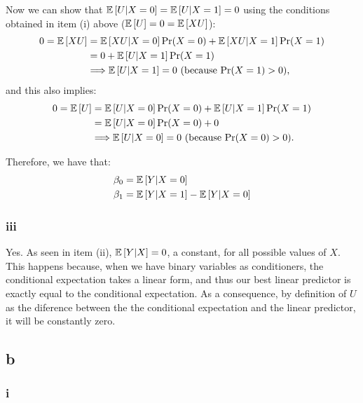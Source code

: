 \documentclass[12pt]{paper}
\begin{document}
Now we can show that $\mathbb{E} \left [ U|X=0 \right ]=\mathbb{E} \left [ U|X=1 \right ]=0$ using the conditions obtained in item (i) above ($\mathbb{E} \left [ U \right ]=0=\mathbb{E} \left [ XU \right ]$):
\begin{equation}
\begin{split}
0=\mathbb{E} \left [ XU \right ]&=\mathbb{E} \left [ XU|X=0 \right ]\Pr(X=0)+\mathbb{E} \left [ XU|X=1 \right ]\Pr(X=1)\\
&=0+\mathbb{E} \left [ U|X=1 \right ]\Pr(X=1)\\
&\Longrightarrow \mathbb{E} \left [ U|X=1 \right ]=0 \text{        (because $\Pr(X=1)>0$)},
\end{split}
\end{equation}
\noindent and this also implies:
\begin{equation}
\begin{split}
0=\mathbb{E} \left [ U \right ]&=\mathbb{E} \left [ U|X=0 \right ]\Pr(X=0)+\mathbb{E} \left [ U|X=1 \right ]\Pr(X=1)\\
&=\mathbb{E} \left [ U|X=0 \right ]\Pr(X=0)+0\\
&\Longrightarrow \mathbb{E} \left [ U|X=0 \right ]=0 \text{        (because $\Pr(X=0)>0$)}.
\end{split}
\end{equation}

Therefore, we have that:
\begin{equation}
\begin{split}
\beta_0&=\mathbb{E} \left [ Y|X=0 \right ]\\
\beta_1&=\mathbb{E} \left [ Y|X=1 \right ]-\mathbb{E} \left [ Y|X=0 \right ]\\
\end{split}
\end{equation}

\subsubsection*{iii}

Yes. As seen in item (ii), $\mathbb{E} \left [ Y|X \right ]=0$, a constant, for all possible values of $X$. This happens because, when we have binary variables as conditioners, the conditional expectation takes a linear form, and thus our best linear predictor is exactly equal to the conditional expectation. As a consequence, by definition of $U$ as the diference between the the conditional expectation and the linear predictor, it will be constantly zero.

\subsection*{b}

\subsubsection*{i}
\end{document}
